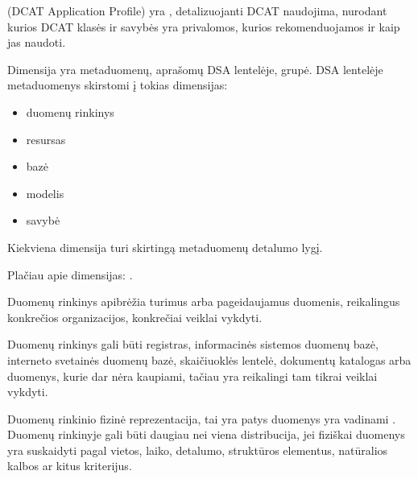 \documentclass[letterpaper,10pt,lithuanian]{sphinxmanual}
\begin{document}
\begin{description}
\sphinxAtStartPar
{} (DCAT Application Profile) yra , detalizuojanti
DCAT naudojima, nurodant kurios DCAT klasės ir savybės yra privalomos,
kurios rekomenduojamos ir kaip jas naudoti.

\sphinxAtStartPar
Dimensija yra metaduomenų, aprašomų DSA lentelėje, grupė. DSA lentelėje
metaduomenys skirstomi į tokias dimensijas:
\begin{itemize}
\item {} 
\sphinxAtStartPar
duomenų rinkinys

\item {} 
\sphinxAtStartPar
resursas

\item {} 
\sphinxAtStartPar
bazė

\item {} 
\sphinxAtStartPar
modelis

\item {} 
\sphinxAtStartPar
savybė

\end{itemize}

\sphinxAtStartPar
Kiekviena dimensija turi skirtingą metaduomenų detalumo lygį.

\sphinxAtStartPar
Plačiau apie dimensijas: {\hyperref[\detokenize{dimensijos:dimensijos}]{}}.

\sphinxAtStartPar
Duomenų rinkinys apibrėžia turimus arba pageidaujamus duomenis,
reikalingus konkrečios organizacijos, konkrečiai veiklai vykdyti.

\sphinxAtStartPar
Duomenų rinkinys gali būti registras, informacinės sistemos duomenų
bazė, interneto svetainės duomenų bazė, skaičiuoklės lentelė, dokumentų
katalogas arba duomenys, kurie dar nėra kaupiami, tačiau yra reikalingi
tam tikrai veiklai vykdyti.

\sphinxAtStartPar
Duomenų rinkinio fizinė reprezentacija, tai yra patys duomenys yra
vadinami {\hyperref[\detokenize{savokos:term-distribucija}]{}}. Duomenų rinkinyje gali būti daugiau
nei viena distribucija, jei fiziškai duomenys yra suskaidyti
pagal vietos, laiko, detalumo, struktūros elementus, natūralios kalbos
ar kitus kriterijus.


\end{description}
\end{document}

